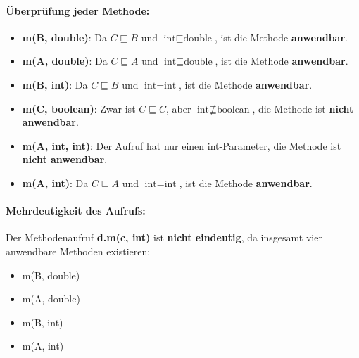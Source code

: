 \documentclass[11pt,a4paper]{article}
\begin{document}
\paragraph{Überprüfung jeder Methode:}
\begin{itemize}
    \item \textbf{m(B, double)}: Da $C \sqsubseteq B$ und $\text{int} \sqsubseteq \text{double}$, ist die Methode \textbf{anwendbar}.
    \item \textbf{m(A, double)}: Da $C \sqsubseteq A$ und $\text{int} \sqsubseteq \text{double}$, ist die Methode \textbf{anwendbar}.
    \item \textbf{m(B, int)}: Da $C \sqsubseteq B$ und $\text{int} = \text{int}$, ist die Methode \textbf{anwendbar}.
    \item \textbf{m(C, boolean)}: Zwar ist $C \sqsubseteq C$, aber $\text{int} \not\sqsubseteq \text{boolean}$, die Methode ist \textbf{nicht anwendbar}.
    \item \textbf{m(A, int, int)}: Der Aufruf hat nur einen int-Parameter, die Methode ist \textbf{nicht anwendbar}.
    \item \textbf{m(A, int)}: Da $C \sqsubseteq A$ und $\text{int} = \text{int}$, ist die Methode \textbf{anwendbar}.
\end{itemize}

\paragraph{Mehrdeutigkeit des Aufrufs:}

Der Methodenaufruf \textbf{d.m(c, int)} ist \textbf{nicht eindeutig}, da insgesamt vier anwendbare Methoden existieren:
\begin{itemize}
    \item m(B, double)
    \item m(A, double)
    \item m(B, int)
    \item m(A, int)
\end{itemize}
\end{document}
